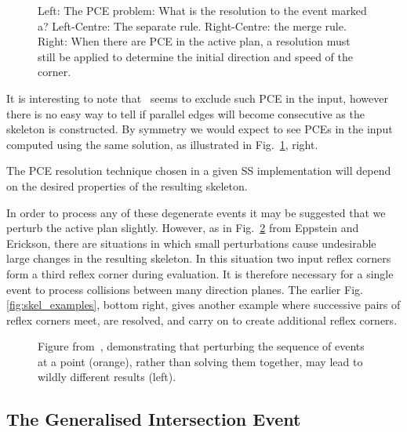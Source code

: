 \begin{figure}
  \centering
  \def\svgwidth{1.0\columnwidth}
  
  \caption[An issue with parallel consecutive edges]{\label{fig:skel_linear_ambig} Left: The PCE problem: What is the resolution to the event marked a? Left-Centre: The separate rule. Right-Centre: the merge rule. Right: When there are PCE in the active plan, a resolution must still be applied to determine the initial direction and speed of the corner.}
\end{figure}

It is interesting to note that~\cite{Aichholzer95} seems to exclude such PCE in the input, however there is no easy way to tell if parallel edges will become consecutive as the skeleton is constructed. By symmetry we would expect to see PCEs in the input computed using the same solution, as illustrated in Fig.~\ref{fig:skel_linear_ambig}, right.

The PCE resolution technique chosen in a given SS implementation will depend on the desired properties of the resulting skeleton.

In order to process any of these degenerate events it may be suggested that we perturb the active plan slightly. However, as in Fig.~\ref{fig:skel_reflex_combine} from  Eppstein and Erickson\cite{Epp:98}, there are situations in which small perturbations cause undesirable large changes in the resulting skeleton. In this situation two input reflex corners form a third reflex corner during evaluation. It is therefore necessary for a single event to process collisions between many direction planes. The earlier Fig.\ref{fig:skel_examples}, bottom right, gives another example where successive pairs of reflex corners meet, are resolved, and carry on to create additional reflex corners.

\begin{figure}
  \centering
  \def\svgwidth{0.6\columnwidth}
  
  \caption[Perturbing event sequences may lead to wildly different results]{\label{fig:skel_reflex_combine}Figure from~\cite{Epp:98}, demonstrating that perturbing the sequence of events at a point (orange), rather than solving them together, may lead to wildly different results (left).}
\end{figure}

\FloatBarrier
\subsection{The Generalised Intersection Event}
\label{s:gie}

